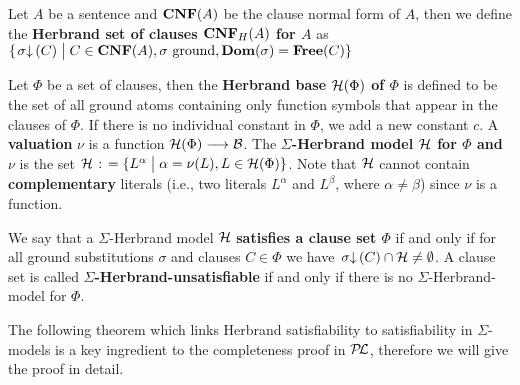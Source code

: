\documentclass{\filespath jancl}
\def\Cnf{\hbox{\bf CNF}}               %
\def\free{\hbox{\bf Free}}
\def\Dom{\hbox{\bf Dom}}
\def\to{\longrightarrow}
\def\setdivider{\;\bigl|\;}
\def\deq{{\;\colon\kern-.2em=\;}}
\newcommand{\Tval}{{\cal B}}
\def\scapply#1#2{{\left.#1\right\downarrow(#2)}}
\def\presuppl{{\cal P\kern-.4ex L}}
\def\Cnfh{\Cnf_H}
\def\Herbrandbase{{\cH}}
\begin{document}
\begin{definition}
  Let $A$ be a sentence and $\Cnf(A)$ be the clause normal form of $A$, then we
  define the {\bf Herbrand set of clauses $\Cnfh(A)$ for $A$} as
  \(\{\scapply\sigma{C}\setdivider C\in\Cnf(A), \sigma\ \mbox{\rm ground},
  \Dom(\sigma)=\free(C)\}\)
  
  Let $\Phi$ be a set of clauses, then the {\bf Herbrand base
    $\Herbrandbase(\Phi)$ of $\Phi$} is defined to be the set of all ground
  atoms containing only function symbols that appear in the clauses of $\Phi$. If
  there is no individual constant in $\Phi$, we add a new constant $c$. A {\bf
    valuation} $\nu$ is a function $\Herbrandbase(\Phi)\to\Tval$.  The {\bf
    $\Sigma$-Herbrand model ${\cal H}$ for $\Phi$ and $\nu$} is the set
  $\cH\deq\{L^\alpha\setdivider\alpha=\nu(L), L\in\Herbrandbase(\Phi)\}$. Note
  that ${\cal H}$ cannot contain {\bf complementary} literals (i.e., two literals
  $L^\alpha$ and $L^\beta$, where $\alpha\ne\beta$) since $\nu$ is a function.
  
  We say that a $\Sigma$-Herbrand model ${\cal H}$ {\bf satisfies a clause set $\Phi$}
  if and only if for all ground substitutions $\sigma$ and clauses $C\in\Phi$ we have
  $\scapply{\sigma}{C}\cap \cH\ne\emptyset$. A clause set is called {\bf
    $\Sigma$-Herbrand-unsatisfiable} if and only if there is no $\Sigma$-Herbrand-model for
  $\Phi$.
\end{definition}
The following theorem which links Herbrand satisfiability to satisfiability in
$\Sigma$-models is a key ingredient to the completeness proof in $\presuppl$,
therefore we will give the proof in detail.

\def\leqc{[\kern-0.18em[} 
\def\reqc{]\kern-0.18em]} 
\def\eqc#1{{\leqc{#1}\reqc}}
\end{document}
